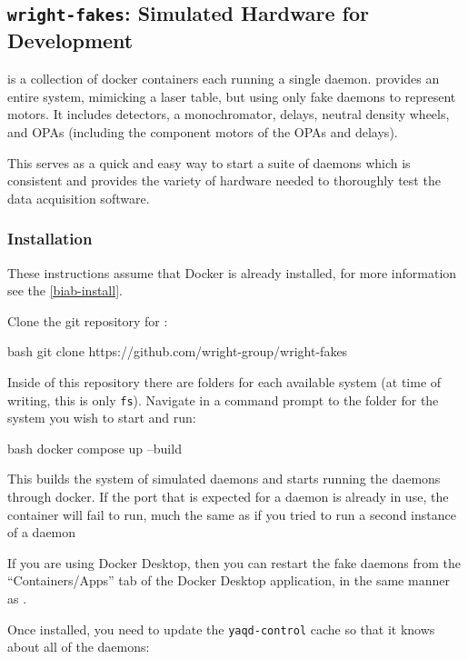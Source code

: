 \subsection{\texttt{wright-fakes}: Simulated Hardware for Development}
\label{wright-fakes}

\wrightfakes is a collection of docker containers each running a single \yaq{} daemon.
\wrightfakes provides an entire system, mimicking a laser table, but using only fake daemons to represent motors.
It includes detectors, a monochromator, delays, neutral density wheels, and OPAs (including the component motors of the OPAs and delays).

This serves as a quick and easy way to start a suite of \yaq{} daemons which is consistent and provides the variety of hardware needed to thoroughly test the data acquisition software.

\subsubsection{Installation}
These instructions assume that Docker is already installed, for more information see the \ref{biab-install}.


Clone the git repository for \wrightfakes:

\begin{codefragment}{bash}
git clone https://github.com/wright-group/wright-fakes
\end{codefragment}

Inside of this repository there are folders for each available system (at time of writing, this is only \texttt{fs}).
Navigate in a command prompt to the folder for the system you wish to start and run:

\begin{codefragment}{bash}
docker compose up --build
\end{codefragment}

This builds the system of simulated daemons and starts running the daemons through docker.
If the port that is expected for a \yaq{} daemon is already in use, the container will fail to run, much the same as if you tried to run a second instance of a \yaq{} daemon


If you are using Docker Desktop, then you can restart the fake daemons from the ``Containers/Apps'' tab of the Docker Desktop application, in the same manner as \biab.

Once installed, you need to update the \texttt{yaqd-control} cache so that it knows about all of the daemons:

